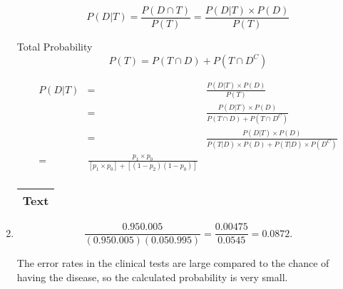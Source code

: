 \documentclass[a4paper,12pt]{article}
\begin{document}
\begin{enumerate}
\begin{framed}
\[ P(D|T) = \frac{P(D \cap T)}{P(T)} = \frac{P(D|T) \times P(D)}{P(T)}\]

\end{framed}

Total Probability
\[P(T) = P(T \cap D) + P(T \cap D^{C})\]


\begin{eqnarray*}
P(D|T) &=&   \frac{P(D|T) \times P(D)}{P(T)}\\
&=& \frac{P(D|T) \times P(D)}{P(T \cap D) + P(T \cap D^{C})}\\
&=& \frac{P(D|T) \times P(D)}{P(T|D) \times P(D) + P(T|D) \times P(D^{C})}\\
=& \frac{p_1 \times p_0}{\left[p_1 \times p_0\right] + \left[(1- p_2 )(1- p_0)\right]}\\
\end{eqnarray*}



\begin{table}[ht!]
 \centering
 \begin{tabular}{|p{15cm}|}
 \hline
\noindent Text
\\ \hline
  \end{tabular}
\end{table}

\item 

\[\frac{0.95 0.005 }{(0.95 0.005) (0.05 0.995) } = \frac{0.00475 }{0.0545} = 0.0872.\]

The error rates in the clinical tests are large compared to the chance of having
the disease, so the calculated probability is very small.
\end{enumerate}
\end{document}

